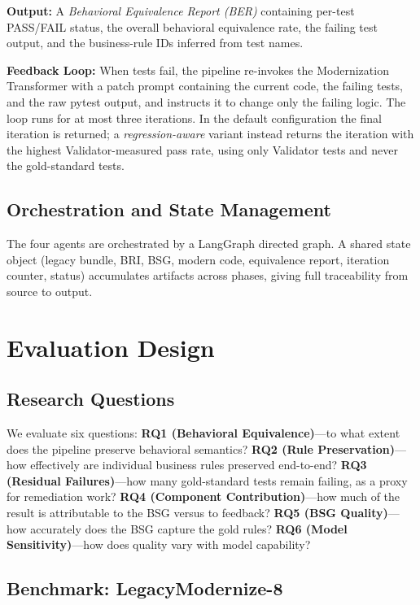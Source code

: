 \documentclass[conference]{IEEEtran}
\begin{document}
\textbf{Output:} A \textit{Behavioral Equivalence Report (BER)} containing per-test PASS/FAIL status, the overall behavioral equivalence rate, the failing test output, and the business-rule IDs inferred from test names.

\textbf{Feedback Loop:} When tests fail, the pipeline re-invokes the Modernization Transformer with a patch prompt containing the current code, the failing tests, and the raw pytest output, and instructs it to change only the failing logic. The loop runs for at most three iterations. In the default configuration the final iteration is returned; a \textit{regression-aware} variant instead returns the iteration with the highest Validator-measured pass rate, using only Validator tests and never the gold-standard tests.

\subsection{Orchestration and State Management}

The four agents are orchestrated by a LangGraph directed graph. A shared state object (legacy bundle, BRI, BSG, modern code, equivalence report, iteration counter, status) accumulates artifacts across phases, giving full traceability from source to output.

\section{Evaluation Design}

\subsection{Research Questions}

We evaluate six questions: \textbf{RQ1 (Behavioral Equivalence)}---to what extent does the pipeline preserve behavioral semantics? \textbf{RQ2 (Rule Preservation)}---how effectively are individual business rules preserved end-to-end? \textbf{RQ3 (Residual Failures)}---how many gold-standard tests remain failing, as a proxy for remediation work? \textbf{RQ4 (Component Contribution)}---how much of the result is attributable to the BSG versus to feedback? \textbf{RQ5 (BSG Quality)}---how accurately does the BSG capture the gold rules? \textbf{RQ6 (Model Sensitivity)}---how does quality vary with model capability?

\subsection{Benchmark: LegacyModernize-8}
\label{sec:benchmark}
\end{document}

